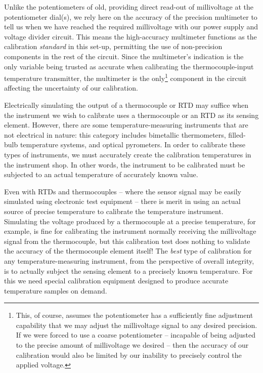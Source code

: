 Unlike the potentiometers of old, providing direct read-out of millivoltage at the potentiometer dial(s), we rely here on the accuracy of the precision multimeter to tell us when we have reached the required millivoltage with our power supply and voltage divider circuit.  This means the high-accuracy multimeter functions as the calibration \textit{standard} in this set-up, permitting the use of non-precision components in the rest of the circuit.  Since the multimeter's indication is the only variable being trusted as accurate when calibrating the thermocouple-input temperature transmitter, the multimeter is the only\footnote{This, of course, assumes the potentiometer has a sufficiently fine adjustment capability that we may adjust the millivoltage signal to any desired precision.  If we were forced to use a coarse potentiometer -- incapable of being adjusted to the precise amount of millivoltage we desired -- then the accuracy of our calibration would also be limited by our inability to precisely control the applied voltage.} component in the circuit affecting the uncertainty of our calibration.

\vskip 10pt

\filbreak

Electrically simulating the output of a thermocouple or RTD may suffice when the instrument we wish to calibrate uses a thermocouple or an RTD as its sensing element.  However, there are some temperature-measuring instruments that are not electrical in nature: this category includes bimetallic thermometers, filled-bulb temperature systems, and optical pyrometers.  In order to calibrate these types of instruments, we must accurately create the calibration temperatures in the instrument shop.  In other words, the instrument to be calibrated must be subjected to an actual temperature of accurately known value.

Even with RTDs and thermocouples -- where the sensor signal may be easily simulated using electronic test equipment -- there is merit in using an actual source of precise temperature to calibrate the temperature instrument.  Simulating the voltage produced by a thermocouple at a precise temperature, for example, is fine for calibrating the instrument normally receiving the millivoltage signal from the thermocouple, but this calibration test does nothing to validate the accuracy of the thermocouple element itself!  The \textit{best} type of calibration for any temperature-measuring instrument, from the perspective of overall integrity, is to actually subject the sensing element to a precisely known temperature.  For this we need special calibration equipment designed to produce accurate temperature samples on demand.

